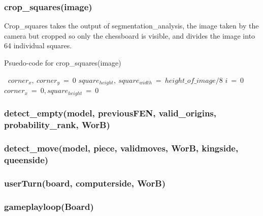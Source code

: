 \documentclass[onecolumn]{IEEEtran}
\begin{document}
\subsubsection{crop\_squares(image)} 
Crop\_squares takes the output of segmentation\_analysis, the image taken by the camera but cropped so only the chessboard is visible, and divides the image into 64 individual squares. 

\begin{algorithm}[h!]
\caption{Psuedo-code for crop\_squares(image)}
\begin{algorithmic}
\STATE $\:$ 
\STATE $corner_x,\:corner_y\:=\:0$ 
\STATE $square_{height},\:square_{width}\:=\:height\_of\_image / 8$ 
\STATE $i\:=\:0$
\STATE $\:$ 
\STATE $\:$ 
\STATE $\:$ 
\STATE $\:$ 
\ENDFOR
\STATE $corner_x\:=\:0, square_{height}\:=\:0$
\STATE $\:$ 
\ENDWHILE
\end{algorithmic}
\end{algorithm}
\subsubsection{detect\_empty(model, previousFEN, valid\_origins, probability\_rank, WorB)}

\subsubsection{detect\_move(model, piece, validmoves, WorB, kingside, queenside)}
\subsubsection{userTurn(board, computerside, WorB)}
\subsubsection{gameplayloop(Board)}
\end{document}
